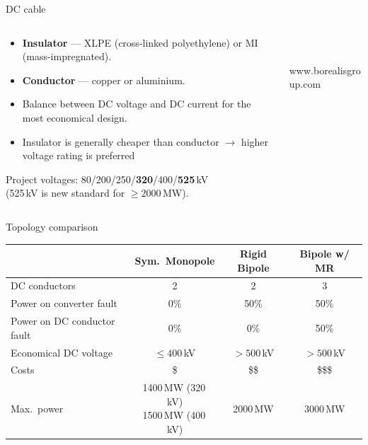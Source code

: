 \begin{frame}{DC cable}
  \begin{columns}[c,onlytextwidth]
    \begin{column}{0.56\textwidth}
      \begin{itemize}
        \setlength{\itemsep}{0.25em}
        \item \textbf{Insulator} --- XLPE (cross-linked polyethylene) or
              MI (mass-impregnated).
        \item \textbf{Conductor} --- copper or aluminium.
        \item Balance between DC voltage and DC current for the most
              economical design.
        \item Insulator is generally cheaper than conductor
              $\rightarrow$ higher voltage rating is preferred
      \end{itemize}
      \vspace{0.3em}
      Project voltages: 80/200/250/\textbf{320}/400/\textbf{525}\,kV\\
      (525\,kV is new standard for $\ge 2000$\,MW).
    \end{column}
    \begin{column}{0.40\textwidth}\centering
      \\[0.4em]
      \\
      {\color{atGray}\scriptsize www.borealisgroup.com}
    \end{column}
  \end{columns}
\end{frame}

\begin{frame}{Topology comparison}
  \centering
  \renewcommand{\arraystretch}{1.3}
  \begin{tabular}{@{}p{4.6cm} c c c@{}}
     & \textbf{Sym.\ Monopole} & \textbf{Rigid Bipole} & \textbf{Bipole w/ MR} \\
    \hline
    DC conductors                         & 2 & 2 & 3 \\
    Power on converter fault              & 0\% & 50\% & 50\% \\
    Power on DC conductor fault           & 0\% & 0\% & 50\% \\
    Economical DC voltage                 & $\le 400$\,kV & $>500$\,kV & $>500$\,kV \\
    Costs                                 & \$ & \$\$ & \$\$\$ \\
    Max.\ power                           & \makecell{1400\,MW (320\,kV)\\1500\,MW (400\,kV)} & 2000\,MW & 3000\,MW \\
    \hline
  \end{tabular}
\end{frame}
